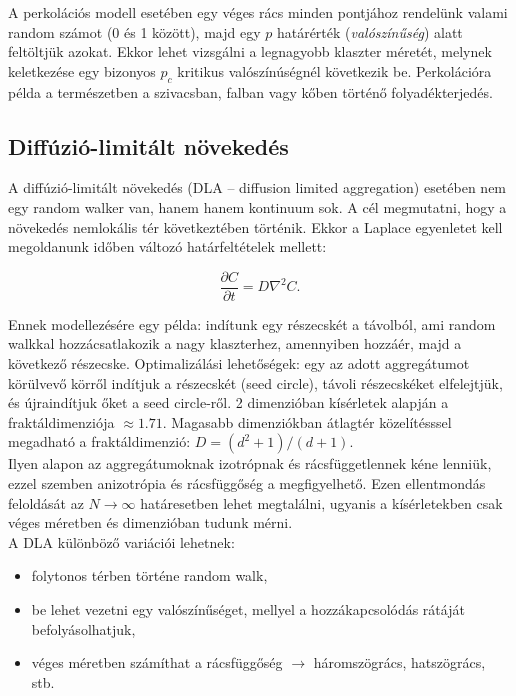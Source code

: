 \documentclass[12pt]{article}
\theoremstyle{plain}
\begin{document}
A perkolációs modell esetében egy véges rács minden pontjához rendelünk valami random számot (0 és 1 között), majd  egy $p$ határérték (\textit{valószínűség}) alatt feltöltjük azokat. Ekkor lehet vizsgálni a legnagyobb klaszter méretét, melynek keletkezése egy bizonyos $p_c$ kritikus valószínúségnél következik be. Perkolációra példa a természetben a szivacsban, falban vagy kőben történő folyadékterjedés. 

\subsection{Diffúzió-limitált növekedés}
A diffúzió-limitált növekedés (DLA -- diffusion limited aggregation) esetében nem egy random walker van, hanem hanem kontinuum sok. A cél megmutatni, hogy a növekedés nemlokális tér következtében történik. Ekkor a Laplace egyenletet kell megoldanunk időben változó határfeltételek mellett:

\begin{equation}
\frac{\partial C}{\partial t} = D \nabla^2 C.
\end{equation}

Ennek modellezésére egy példa: indítunk egy részecskét a távolból, ami random walkkal hozzácsatlakozik a nagy klaszterhez, amennyiben hozzáér, majd a következő részecske. Optimalizálási lehetőségek: egy az adott aggregátumot körülvevő körről indítjuk a részecskét (seed circle), távoli részecskéket elfelejtjük, és újraindítjuk őket a seed circle-ről. 2 dimenzióban kísérletek alapján a fraktáldimenziója $\approx 1.71$. Magasabb dimenziókban átlagtér közelítésssel megadható a fraktáldimenzió: $D = \left(d^2 + 1 \right)/\left( d+1\right)$. \\

Ilyen alapon az aggregátumoknak izotrópnak és rácsfüggetlennek kéne lenniük, ezzel szemben anizotrópia és rácsfüggőség a megfigyelhető. Ezen ellentmondás feloldását az $N \rightarrow \infty$ határesetben lehet megtalálni, ugyanis a kísérletekben csak véges méretben és dimenzióban tudunk mérni. \\

A DLA különböző variációi lehetnek:

\begin{itemize}
\item folytonos térben történe random walk,
\item be lehet vezetni egy valószínűséget, mellyel a hozzákapcsolódás rátáját befolyásolhatjuk,
\item véges méretben számíthat a rácsfüggőség $\rightarrow$ háromszögrács, hatszögrács, stb.
\end{itemize}
\end{document}
